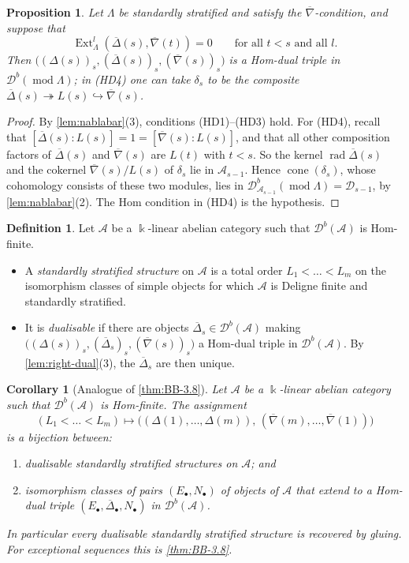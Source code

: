 \documentclass[11pt,reqno]{amsart}
\theoremstyle{plain}
\newtheorem{proposition}[theorem]{Proposition}
\newtheorem{corollary}[theorem]{Corollary}
\theoremstyle{definition}
\newtheorem{definition}[theorem]{Definition}
\theoremstyle{remark}
\newcommand{\kk}{\Bbbk}
\DeclareMathOperator{\Ext}{Ext}
\DeclareMathOperator{\rad}{rad}
\DeclareMathOperator{\cone}{cone}
\newcommand{\modd}{\operatorname{mod}}
\newcommand{\Db}{\mathcal{D}^b}
\newcommand{\nablabar}{\overline{\nabla}}
\newcommand{\Deltabar}{\overline{\Delta}}
\newcommand{\cD}{\mathcal{D}}
\newcommand{\cA}{\mathcal{A}}
\begin{document}
\begin{proposition}\label{prop:dualisable}
Let $\Lambda$ be standardly stratified and satisfy the $\nablabar$-condition, and suppose that
\[\Ext^l_\Lambda(\Deltabar(s),\nablabar(t))=0\qquad\text{for all }t<s\text{ and all }l.\]
Then $\big((\Delta(s))_s,(\Deltabar(s))_s,(\nablabar(s))_s\big)$ is a Hom-dual triple in $\Db(\modd\Lambda)$; in (HD4) one can take $\delta_s$ to be the composite $\Deltabar(s)\twoheadrightarrow L(s)\hookrightarrow\nablabar(s)$.
\end{proposition}

\begin{proof}
By \cref{lem:nablabar}(3), conditions (HD1)--(HD3) hold. For (HD4), recall that $[\Deltabar(s):L(s)]=1=[\nablabar(s):L(s)]$, and that all other composition factors of $\Deltabar(s)$ and $\nablabar(s)$ are $L(t)$ with $t<s$. So the kernel $\rad\Deltabar(s)$ and the cokernel $\nablabar(s)/L(s)$ of $\delta_s$ lie in $\cA_{s-1}$. Hence $\cone(\delta_s)$, whose cohomology consists of these two modules, lies in $\Db_{\cA_{s-1}}(\modd\Lambda)=\cD_{s-1}$, by \cref{lem:nablabar}(2). The Hom condition in (HD4) is the hypothesis.
\end{proof}

\begin{definition}
Let $\cA$ be a $\kk$-linear abelian category such that $\Db(\cA)$ is Hom-finite.
\begin{itemize}
\item A \emph{standardly stratified structure} on $\cA$ is a total order $L_1<\dots<L_m$ on the isomorphism classes of simple objects for which $\cA$ is Deligne finite and standardly stratified.
\item It is \emph{dualisable} if there are objects $\Deltabar_s\in\Db(\cA)$ making $\big((\Delta(s))_s,(\Deltabar_s)_s,(\nablabar(s))_s\big)$ a Hom-dual triple in $\Db(\cA)$. By \cref{lem:right-dual}(3), the $\Deltabar_s$ are then unique.
\end{itemize}
\end{definition}

\begin{corollary}[Analogue of {\cref{thm:BB-3.8}}]\label{cor:BB38}
Let $\cA$ be a $\kk$-linear abelian category such that $\Db(\cA)$ is Hom-finite. The assignment
\[(L_1<\dots<L_m)\longmapsto\big((\Delta(1),\dots,\Delta(m)),\,(\nablabar(m),\dots,\nablabar(1))\big)\]
is a bijection between:
\begin{enumerate}
\item dualisable standardly stratified structures on $\cA$; and
\item isomorphism classes of pairs $(E_\bullet,N_\bullet)$ of objects of $\cA$ that extend to a Hom-dual triple $(E_\bullet,\Deltabar_\bullet,N_\bullet)$ in $\Db(\cA)$.
\end{enumerate}
In particular every dualisable standardly stratified structure is recovered by gluing. For exceptional sequences this is \cref{thm:BB-3.8}.
\end{corollary}
\end{document}
